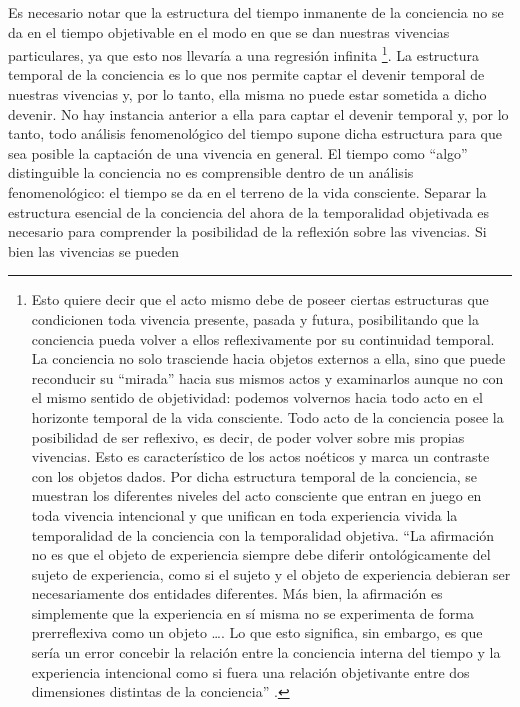 Es necesario notar que la estructura del tiempo inmanente de la
conciencia no se da en el tiempo objetivable en el modo en que se dan
nuestras vivencias particulares, ya que esto nos llevaría a una
regresión infinita \cite[p.~86]{zahavi2010}\footnote{Esto quiere decir que el
  acto mismo debe de poseer ciertas estructuras que condicionen toda
  vivencia presente, pasada y futura, posibilitando que la conciencia
  pueda volver a ellos reflexivamente por su continuidad temporal. La
  conciencia no solo trasciende hacia objetos externos a ella, sino que
  puede reconducir su ``mirada'' hacia sus mismos actos y examinarlos
  aunque no con el mismo sentido de objetividad: podemos volvernos hacia
  todo acto en el horizonte temporal de la vida consciente. Todo acto de
  la conciencia posee la posibilidad de ser reflexivo, es decir, de
  poder volver sobre mis propias vivencias. Esto es característico de
  los actos noéticos y marca un contraste con los objetos dados. Por
  dicha estructura temporal de la conciencia, se muestran los diferentes
  niveles del acto consciente que entran en juego en toda vivencia
  intencional y que unifican en toda experiencia vivida la temporalidad
  de la conciencia con la temporalidad objetiva. ``La afirmación no es
  que el objeto de experiencia siempre debe diferir ontológicamente del
  sujeto de experiencia, como si el sujeto y el objeto de experiencia
  debieran ser necesariamente dos entidades diferentes. Más bien, la
  afirmación es simplemente que la experiencia en sí misma no se
  experimenta de forma prerreflexiva como un objeto \ldots. Lo que
  esto significa, sin embargo, es que sería un error concebir la
  relación entre la conciencia interna del tiempo y la experiencia
  intencional como si fuera una relación objetivante entre dos
  dimensiones distintas de la conciencia'' \cite[p.~332]{zahavi2010}.}. La
estructura temporal de la conciencia es lo que nos permite captar el
devenir temporal de nuestras vivencias y, por lo tanto, ella misma no
puede estar sometida a dicho devenir. No hay instancia anterior a ella
para captar el devenir temporal y, por lo tanto, todo análisis
fenomenológico del tiempo supone dicha estructura para que sea posible
la captación de una vivencia en general. El tiempo como ``algo''
distinguible la conciencia no es comprensible dentro de un análisis
fenomenológico: el tiempo se da en el terreno de la vida consciente.
Separar la estructura esencial de la conciencia del ahora de la
temporalidad objetivada es necesario para comprender la posibilidad de
la reflexión sobre las vivencias. Si bien las vivencias se pueden
